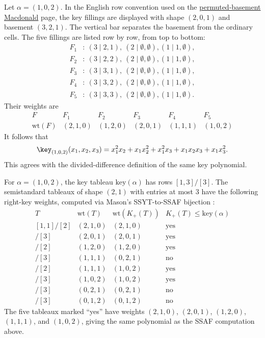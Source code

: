 \begin{example*}
Let $\alpha=(1,0,2)$.  In the English row convention used on the
\hyperref[macdonaldEperm]{permuted-basement Macdonald} page, the key fillings
are displayed with shape $(2,0,1)$ and basement $(3,2,1)$.
The vertical bar separates the basement from the ordinary cells.  The five
fillings are listed row by row, from top to bottom:
\[
\begin{aligned}
F_1&:\ (3\mid 2,1),\ (2\mid \emptyset,\emptyset),
  (1\mid 1,\emptyset),\\
F_2&:\ (3\mid 2,2),\ (2\mid \emptyset,\emptyset),
  (1\mid 1,\emptyset),\\
F_3&:\ (3\mid 3,1),\ (2\mid \emptyset,\emptyset),
  (1\mid 1,\emptyset),\\
F_4&:\ (3\mid 3,2),\ (2\mid \emptyset,\emptyset),
  (1\mid 1,\emptyset),\\
F_5&:\ (3\mid 3,3),\ (2\mid \emptyset,\emptyset),
  (1\mid 1,\emptyset).
\end{aligned}
\]
Their weights are
\[
\begin{array}{c|ccccc}
F & F_1 & F_2 & F_3 & F_4 & F_5 \\ \hline
\mathrm{wt}(F) &
(2,1,0) & (1,2,0) & (2,0,1) & (1,1,1) & (1,0,2)
\end{array}
\]
It follows that
\[
\key_{(1,0,2)}(x_1,x_2,x_3)
= x_1^2x_2 + x_1x_2^2 + x_1^2x_3
  + x_1x_2x_3 + x_1x_3^2.
\]
This agrees with the divided-difference definition of the same key polynomial.
\end{example*}

\begin{example*}
For $\alpha=(1,0,2)$, the key tableau $\mathrm{key}(\alpha)$ has rows
$[1,3]/[3]$.  The semistandard tableaux of shape $(2,1)$ with entries at
most $3$ have the following right-key weights, computed via Mason's
SSYT-to-SSAF bijection \cite{Mason2009}:
\[
\begin{array}{cccc}
T & \mathrm{wt}(T) & \mathrm{wt}(K_+(T)) & K_+(T)\leq \mathrm{key}(\alpha) \\
\hline
[1,1]/[2] & (2,1,0) & (2,1,0) & \text{yes} \\
[1,1]/[3] & (2,0,1) & (2,0,1) & \text{yes} \\
[1,2]/[2] & (1,2,0) & (1,2,0) & \text{yes} \\
[1,2]/[3] & (1,1,1) & (0,2,1) & \text{no} \\
[1,3]/[2] & (1,1,1) & (1,0,2) & \text{yes} \\
[1,3]/[3] & (1,0,2) & (1,0,2) & \text{yes} \\
[2,2]/[3] & (0,2,1) & (0,2,1) & \text{no} \\
[2,3]/[3] & (0,1,2) & (0,1,2) & \text{no}
\end{array}
\]
The five tableaux marked ``yes'' have weights
$(2,1,0)$, $(2,0,1)$, $(1,2,0)$, $(1,1,1)$, and $(1,0,2)$,
giving the same polynomial as the SSAF computation above.
\end{example*}




